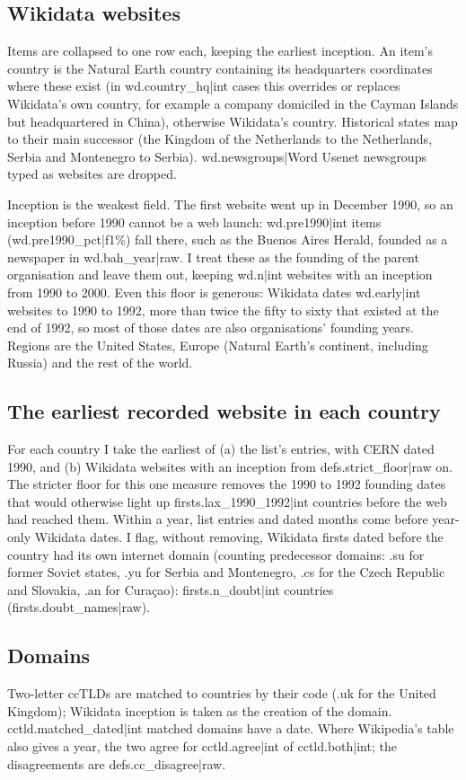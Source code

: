 \documentclass[11pt,a4paper]{article}
\begin{document}
\subsection{Wikidata websites}
Items are collapsed to one row each, keeping the earliest inception. An item's country is the Natural Earth country containing its headquarters coordinates where these exist (in {{wd.country_hq|int}} cases this overrides or replaces Wikidata's own country, for example a company domiciled in the Cayman Islands but headquartered in China), otherwise Wikidata's country. Historical states map to their main successor (the Kingdom of the Netherlands to the Netherlands, Serbia and Montenegro to Serbia). {{wd.newsgroups|Word}} Usenet newsgroups typed as websites are dropped.

Inception is the weakest field. The first website went up in December 1990, so an inception before 1990 cannot be a web launch: {{wd.pre1990|int}} items ({{wd.pre1990_pct|f1}}\%) fall there, such as the Buenos Aires Herald, founded as a newspaper in {{wd.bah_year|raw}}. I treat these as the founding of the parent organisation and leave them out, keeping {{wd.n|int}} websites with an inception from 1990 to 2000. Even this floor is generous: Wikidata dates {{wd.early|int}} websites to 1990 to 1992, more than twice the fifty to sixty that existed at the end of 1992, so most of those dates are also organisations' founding years. Regions are the United States, Europe (Natural Earth's continent, including Russia) and the rest of the world.

\subsection{The earliest recorded website in each country}
For each country I take the earliest of (a) the list's entries, with CERN dated 1990, and (b) Wikidata websites with an inception from {{defs.strict_floor|raw}} on. The stricter floor for this one measure removes the 1990 to 1992 founding dates that would otherwise light up {{firsts.lax_1990_1992|int}} countries before the web had reached them. Within a year, list entries and dated months come before year-only Wikidata dates. I flag, without removing, Wikidata firsts dated before the country had its own internet domain (counting predecessor domains: .su for former Soviet states, .yu for Serbia and Montenegro, .cs for the Czech Republic and Slovakia, .an for Curaçao): {{firsts.n_doubt|int}} countries ({{firsts.doubt_names|raw}}).

\subsection{Domains}
Two-letter ccTLDs are matched to countries by their code (.uk for the United Kingdom); Wikidata inception is taken as the creation of the domain. {{cctld.matched_dated|int}} matched domains have a date. Where Wikipedia's table also gives a year, the two agree for {{cctld.agree|int}} of {{cctld.both|int}}; the disagreements are {{defs.cc_disagree|raw}}.
\end{document}

